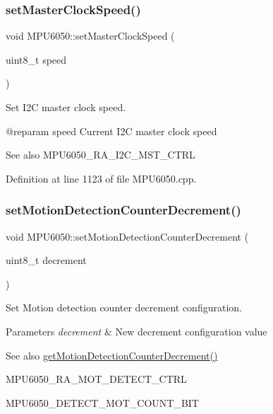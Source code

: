 \mbox{\label{classMPU6050_a8a4779ea709ff0633f9798369478400b}} 
\subsubsection{\texorpdfstring{setMasterClockSpeed()}{setMasterClockSpeed()}}
{\footnotesize\ttfamily void M\+P\+U6050\+::set\+Master\+Clock\+Speed (\begin{DoxyParamCaption}\item[{uint8\+\_\+t}]{speed }\end{DoxyParamCaption})}



Set I2C master clock speed. 

@reparam speed Current I2C master clock speed \begin{DoxySeeAlso}{See also}
M\+P\+U6050\+\_\+\+R\+A\+\_\+\+I2\+C\+\_\+\+M\+S\+T\+\_\+\+C\+T\+RL 
\end{DoxySeeAlso}


Definition at line 1123 of file M\+P\+U6050.\+cpp.

\mbox{\label{classMPU6050_a74cc3ea727afa5d4406175085e60d08c}} 
\subsubsection{\texorpdfstring{setMotionDetectionCounterDecrement()}{setMotionDetectionCounterDecrement()}}
{\footnotesize\ttfamily void M\+P\+U6050\+::set\+Motion\+Detection\+Counter\+Decrement (\begin{DoxyParamCaption}\item[{uint8\+\_\+t}]{decrement }\end{DoxyParamCaption})}



Set Motion detection counter decrement configuration. 


\begin{DoxyParams}{Parameters}
{\em decrement} & New decrement configuration value \\
\hline
\end{DoxyParams}
\begin{DoxySeeAlso}{See also}
\mbox{\hyperlink{classMPU6050_a0ed8de8eb440dbfdec829297527b0da6}{get\+Motion\+Detection\+Counter\+Decrement()}} 

M\+P\+U6050\+\_\+\+R\+A\+\_\+\+M\+O\+T\+\_\+\+D\+E\+T\+E\+C\+T\+\_\+\+C\+T\+RL 

M\+P\+U6050\+\_\+\+D\+E\+T\+E\+C\+T\+\_\+\+M\+O\+T\+\_\+\+C\+O\+U\+N\+T\+\_\+\+B\+IT 
\end{DoxySeeAlso}


